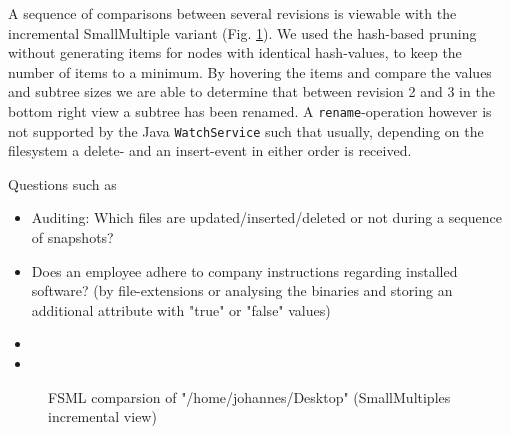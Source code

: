 A sequence of comparisons between several revisions is viewable with the incremental SmallMultiple variant (Fig. \ref{fig:fsml-smallmultiples-incremental}). We used the hash-based pruning without generating items for nodes with identical hash-values, to keep the number of items to a minimum. By hovering the items and compare the values and subtree sizes we are able to determine that between revision 2 and 3 in the bottom right view a subtree has been renamed. A \texttt{rename}-operation however is not supported by the Java \texttt{WatchService} such that usually, depending on the filesystem a delete- and an insert-event in either order is received.

Questions such as 

\begin{itemize}
\item Auditing: Which files are updated/inserted/deleted or not during a sequence of snapshots?
\item Does an employee adhere to company instructions regarding installed software? (by file-extensions or analysing the binaries and storing an additional attribute with "true" or "false" values)
\item 
\item 
\end{itemize}

\begin{figure}[tb]
\caption{\label{fig:fsml-smallmultiples-incremental} FSML comparsion of "/home/johannes/Desktop" (SmallMultiples incremental view)}
\end{figure}

